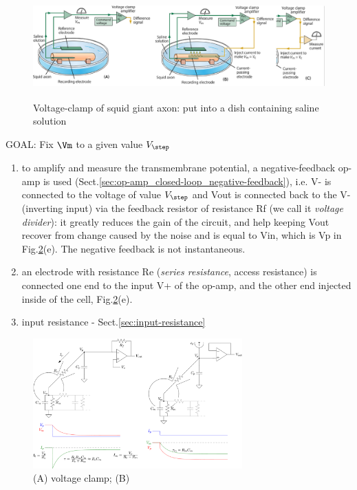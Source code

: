 \begin{figure}[htb]
  \centerline{\includegraphics[height=4cm]{./images/voltage-clamp-HH.eps}}
  \caption{Voltage-clamp of squid giant axon: put
  into a dish containing saline solution}\label{fig:voltage-clamp-HH}
\end{figure}

GOAL: Fix $\Vm$ to a given value $V_\step$
\begin{enumerate}

  \item to amplify and measure the transmembrane potential, a negative-feedback
  op-amp is used (Sect.\ref{sec:op-amp_closed-loop_negative-feedback}), i.e. V-
  is connected to the voltage of value $V_\step$ and Vout is connected back to
  the V- (inverting input) via the feedback resistor of resistance Rf (we call
  it {\it voltage divider}): it greatly reduces the gain of the circuit, and
  help keeping Vout recover from change caused by the noise and is
  equal to Vin, which is Vp in Fig.\ref{fig:op-amp-voltage-clamp-circuit}(e).
  The negative feedback is not instantaneous.

  \item an electrode with resistance Re ({\it series resistance}, access
  resistance) is connected one end to the input V+ of the op-amp, and the other
  end injected inside of the cell,
  Fig.\ref{fig:op-amp-voltage-clamp-circuit}(e).

   \item input resistance - Sect.\ref{sec:input-resistance}

\end{enumerate}

\begin{figure}[htb]
  \centerline{\includegraphics[height=5cm]{./images/op-amp-voltage-clamp-circuit.eps}}
  \caption{(A) voltage clamp; (B) }
  \label{fig:op-amp-voltage-clamp-circuit}
\end{figure}


